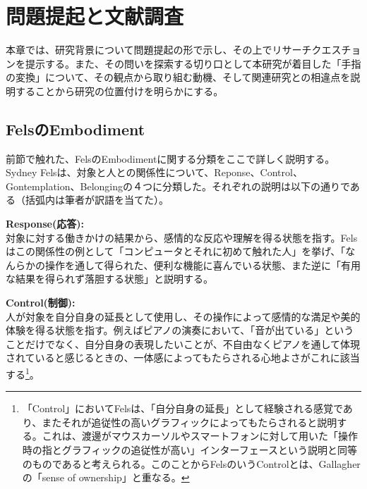 \chapter{問題提起と文献調査}
\label{related_works}

本章では、研究背景について問題提起の形で示し、その上でリサーチクエスチョンを提示する。また、その問いを探索する切り口として本研究が着目した「手指の変換」について、その観点から取り組む動機、そして関連研究との相違点を説明することから研究の位置付けを明らかにする。




\section{FelsのEmbodiment}
前節で触れた、FelsのEmbodimentに関する分類をここで詳しく説明する。
Sydney Felsは、対象と人との関係性について、Reponse、Control、Gontemplation、Belongingの４つに分類した\cite{Fels, Costello2005}。それぞれの説明は以下の通りである（括弧内は筆者が訳語を当てた）。

\textbf{Response(応答):}\\
対象に対する働きかけの結果から、感情的な反応や理解を得る状態を指す。Felsはこの関係性の例として「コンピュータとそれに初めて触れた人」を挙げ、「なんらかの操作を通して得られた、便利な機能に喜んでいる状態、また逆に「有用な結果を得られず落胆する状態」と説明する。

\textbf{Control(制御):}\\
人が対象を自分自身の延長として使用し、その操作によって感情的な満足や美的体験を得る状態を指す。例えばピアノの演奏において、「音が出ている」ということだけでなく、自分自身の表現したいことが、不自由なくピアノを通して体現されていると感じるときの、一体感によってもたらされる心地よさがこれに該当する\footnote{「Control」においてFelsは、「自分自身の延長」として経験される感覚であり、またそれが追従性の高いグラフィックによってもたらされると説明する。これは、渡邊がマウスカーソルやスマートフォンに対して用いた「操作時の指とグラフィックの追従性が高い」インターフェースという説明と同等のものであると考えられる。このことからFelsのいうControlとは、Gallagherの「sense of ownership」と重なる。}。


